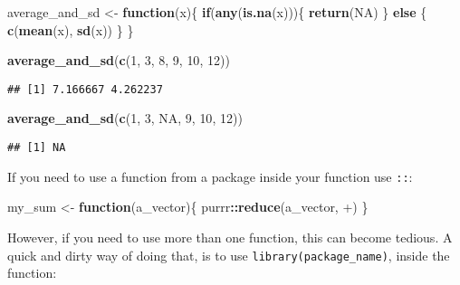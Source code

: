 \documentclass[
]{article}
\newenvironment{Shaded}{\begin{snugshade}}{\end{snugshade}}
\newcommand{\ControlFlowTok}[1]{\textcolor[rgb]{0.13,0.29,0.53}{\textbf{#1}}}
\newcommand{\DataTypeTok}[1]{\textcolor[rgb]{0.13,0.29,0.53}{#1}}
\newcommand{\DecValTok}[1]{\textcolor[rgb]{0.00,0.00,0.81}{#1}}
\newcommand{\KeywordTok}[1]{\textcolor[rgb]{0.13,0.29,0.53}{\textbf{#1}}}
\newcommand{\NormalTok}[1]{#1}
\newcommand{\OperatorTok}[1]{\textcolor[rgb]{0.81,0.36,0.00}{\textbf{#1}}}
\newcommand{\OtherTok}[1]{\textcolor[rgb]{0.56,0.35,0.01}{#1}}
\newcommand{\StringTok}[1]{\textcolor[rgb]{0.31,0.60,0.02}{#1}}
\begin{document}
\begin{Shaded}
\begin{Highlighting}[]
\NormalTok{average\_and\_sd \textless{}{-}}\StringTok{ }\ControlFlowTok{function}\NormalTok{(x)\{}
\ControlFlowTok{if}\NormalTok{(}\KeywordTok{any}\NormalTok{(}\KeywordTok{is.na}\NormalTok{(x)))\{}
    \KeywordTok{return}\NormalTok{(}\OtherTok{NA}\NormalTok{)}
\NormalTok{  \} }\ControlFlowTok{else}\NormalTok{ \{}
    \KeywordTok{c}\NormalTok{(}\KeywordTok{mean}\NormalTok{(x), }\KeywordTok{sd}\NormalTok{(x))}
\NormalTok{    \}}
\NormalTok{\}}

\KeywordTok{average\_and\_sd}\NormalTok{(}\KeywordTok{c}\NormalTok{(}\DecValTok{1}\NormalTok{, }\DecValTok{3}\NormalTok{, }\DecValTok{8}\NormalTok{, }\DecValTok{9}\NormalTok{, }\DecValTok{10}\NormalTok{, }\DecValTok{12}\NormalTok{))}
\end{Highlighting}
\end{Shaded}

\begin{verbatim}
## [1] 7.166667 4.262237
\end{verbatim}

\begin{Shaded}
\begin{Highlighting}[]
\KeywordTok{average\_and\_sd}\NormalTok{(}\KeywordTok{c}\NormalTok{(}\DecValTok{1}\NormalTok{, }\DecValTok{3}\NormalTok{, }\OtherTok{NA}\NormalTok{, }\DecValTok{9}\NormalTok{, }\DecValTok{10}\NormalTok{, }\DecValTok{12}\NormalTok{))}
\end{Highlighting}
\end{Shaded}

\begin{verbatim}
## [1] NA
\end{verbatim}

If you need to use a function from a package inside your function use \texttt{::}:

\begin{Shaded}
\begin{Highlighting}[]
\NormalTok{my\_sum \textless{}{-}}\StringTok{ }\ControlFlowTok{function}\NormalTok{(a\_vector)\{}
\NormalTok{  purrr}\OperatorTok{::}\KeywordTok{reduce}\NormalTok{(a\_vector, }\StringTok{\textasciigrave{}}\DataTypeTok{+}\StringTok{\textasciigrave{}}\NormalTok{)}
\NormalTok{\}}
\end{Highlighting}
\end{Shaded}

However, if you need to use more than one function, this can become tedious. A quick and dirty
way of doing that, is to use \texttt{library(package\_name)}, inside the function:
\end{document}
